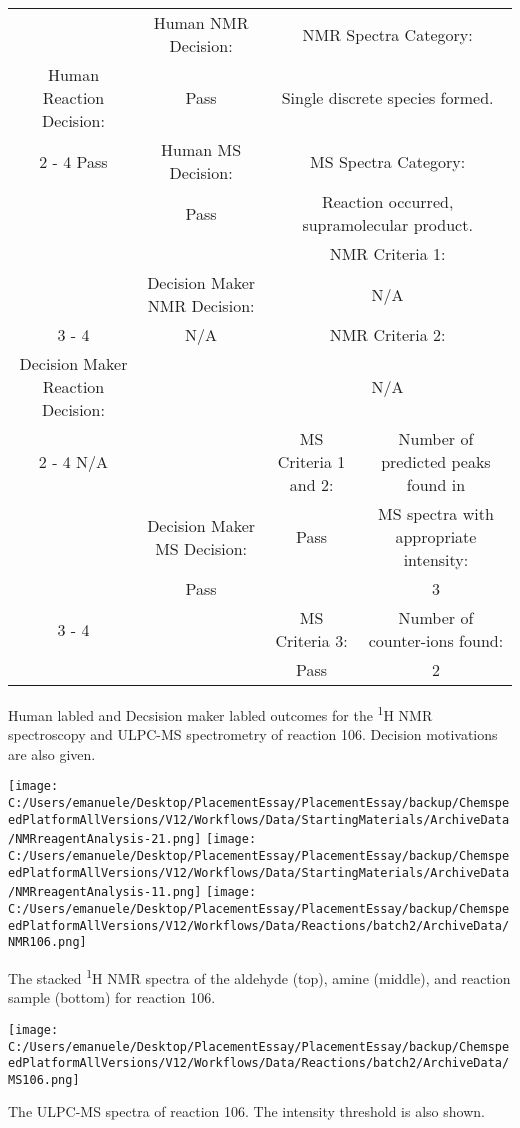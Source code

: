 \documentclass{article}%
\begin{document}
\begin{Decision Table}[H]%
\begin{tabular}{|c|c|c|c|}%
\hline%
&Human NMR Decision:&\multicolumn{2}{|c|}{NMR Spectra Category:}\\%
Human Reaction Decision:&Pass&\multicolumn{2}{|c|}{Single discrete species formed.}\\%
\cline{2%
-%
4}%
Pass&Human MS Decision:&\multicolumn{2}{|c|}{MS Spectra Category:}\\%
&Pass&\multicolumn{2}{|c|}{Reaction occurred, supramolecular product.}\\%
\hline%
&&\multicolumn{2}{|c|}{NMR Criteria 1:}\\%
&Decision Maker NMR Decision:&\multicolumn{2}{|c|}{N/A}\\%
\cline{3%
-%
4}%
&N/A&\multicolumn{2}{|c|}{NMR Criteria 2:}\\%
Decision Maker Reaction Decision:&&\multicolumn{2}{|c|}{N/A}\\%
\cline{2%
-%
4}%
N/A&&MS Criteria 1 and 2:&Number of predicted peaks found in\\%
&Decision Maker MS Decision:&Pass&MS spectra with appropriate intensity:\\%
&Pass&&3\\%
\cline{3%
-%
4}%
&&MS Criteria 3:&Number of counter{-}ions found:\\%
&&Pass&2\\%
\hline%
\end{tabular}%
\caption{Human labled and Decsision maker labled outcomes for the \textsuperscript{1}H NMR spectroscopy and ULPC-MS spectrometry of reaction 106. Decision motivations are also given.}%
\end{Decision Table}%
\begin{NMR Spectra}[H]%
\begin{center}%
\texttt{[image: C:/Users/emanuele/Desktop/PlacementEssay/PlacementEssay/backup/ChemspeedPlatformAllVersions/V12/Workflows/Data/StartingMaterials/ArchiveData/NMRreagentAnalysis-21.png]}\hfill%
\texttt{[image: C:/Users/emanuele/Desktop/PlacementEssay/PlacementEssay/backup/ChemspeedPlatformAllVersions/V12/Workflows/Data/StartingMaterials/ArchiveData/NMRreagentAnalysis-11.png]}\hfill%
\texttt{[image: C:/Users/emanuele/Desktop/PlacementEssay/PlacementEssay/backup/ChemspeedPlatformAllVersions/V12/Workflows/Data/Reactions/batch2/ArchiveData/NMR106.png]}\hfill%
\end{center}%
\caption{The stacked \textsuperscript{1}H NMR spectra of the aldehyde (top), amine (middle), and reaction sample (bottom) for reaction 106.}%
\end{NMR Spectra}%
\begin{MS Spectra}[H]%
\begin{center}%
\texttt{[image: C:/Users/emanuele/Desktop/PlacementEssay/PlacementEssay/backup/ChemspeedPlatformAllVersions/V12/Workflows/Data/Reactions/batch2/ArchiveData/MS106.png]}\hfill%
\end{center}%
\caption{The ULPC-MS spectra of reaction 106. The intensity threshold is also shown.}%
\end{MS Spectra}%
\end{document}

